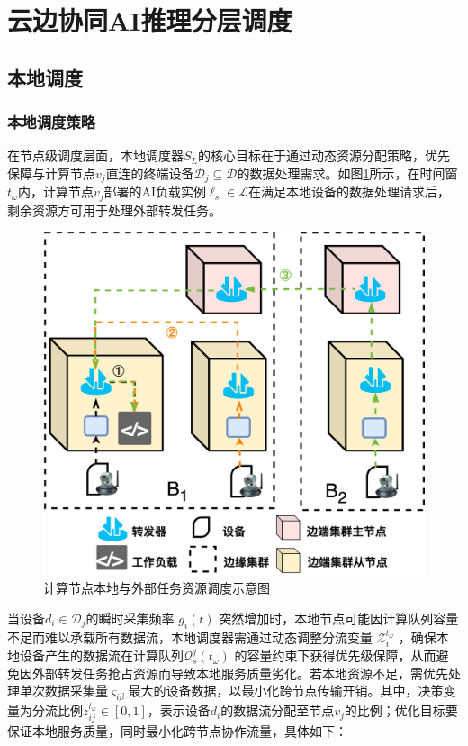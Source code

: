 \section{云边协同AI推理分层调度}

\subsection{本地调度}

\subsubsection{本地调度策略}

在节点级调度层面，本地调度器$S_L$的核心目标在于通过动态资源分配策略，优先保障与计算节点$v_j$直连的终端设备$\mathcal{D}_j \subseteq \mathcal{D}$的数据处理需求。如图\ref{fig:3-8localdevice}所示，在时间窗$t_\omega$内，计算节点$v_j$部署的AI负载实例$\ell_s \in \mathcal{L}$在满足本地设备的数据处理请求后，剩余资源方可用于处理外部转发任务。

\begin{figure}[h]
  \centering
  \includegraphics[width=0.6\linewidth]{pics/3-8本地负载处理.png}
  \caption{计算节点本地与外部任务资源调度示意图}
  \label{fig:3-8localdevice}
\end{figure}

当设备$d_i \in \mathcal{D}_j$的瞬时采集频率 $g_i(t)$ 突然增加时，本地节点可能因计算队列容量不足而难以承载所有数据流，本地调度器需通过动态调整分流变量 $\mathcal{Z}_i^{t_\omega}$ ，确保本地设备产生的数据流在计算队列$\mathcal{Q}_s^j(t_\omega)$ 的容量约束下获得优先级保障，从而避免因外部转发任务抢占资源而导致本地服务质量劣化。若本地资源不足，需优先处理单次数据采集量$\varsigma_{i\beta}$最大的设备数据，以最小化跨节点传输开销。其中，决策变量为分流比例$z_{ij}^{t_\omega} \in [0,1]$，表示设备$d_i$的数据流分配至节点$v_j$的比例；优化目标要保证本地服务质量，同时最小化跨节点协作流量，具体如下：

